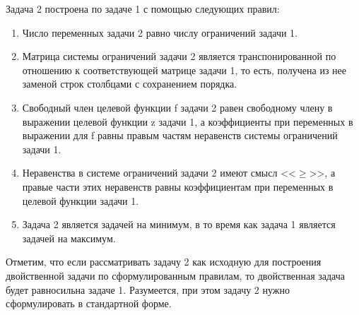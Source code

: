 Задача 2 построена по задаче 1 с помощью следующих правил:
\begin{enumerate}
\item Число переменных задачи 2 равно числу ограничений задачи 1.
\item Матрица системы ограничений задачи 2 является транспонированной по отношению к соответствующей матрице задачи 1, то есть, получена из нее заменой строк столбцами с сохранением порядка.
\item Свободный член целевой функции f задачи 2 равен свободному члену в  выражении целевой функции z задачи 1, а коэффициенты при переменных в выражении для f равны правым частям неравенств системы ограничений задачи 1.
\item Неравенства в системе ограничений задачи 2 имеют смысл <<$\geq{}$>>, а правые части этих неравенств равны коэффициентам при переменных  в целевой функции задачи 1.
\item Задача 2 является задачей на минимум, в то время как задача 1 является задачей на максимум.
\end{enumerate}

Отметим, что если рассматривать задачу 2 как исходную для построения двойственной задачи по сформулированным правилам, то двойственная задача будет равносильна задаче 1. Разумеется, при этом задачу 2 нужно сформулировать в стандартной форме.
\\\\

